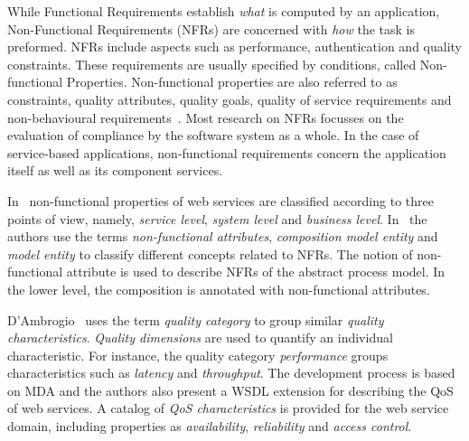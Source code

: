 While Functional Requirements establish \textit{what} is computed by an application, Non-Functional Requirements (NFRs) are concerned with \textit{how} the task is preformed.  
NFRs include aspects such as performance, authentication and quality constraints.
These requirements are usually specified by conditions, called Non-functional Properties.
Non-functional properties are also referred to as constraints, quality attributes, quality goals, quality of service requirements and non-behavioural requirements~\cite{Chung91,MylopoulosBook99,Chung2009}. 
Most research on NFRs focusses on the evaluation of compliance by the software system as a whole. %
In the case of service-based applications, non-functional requirements concern the application itself as well as its component services. 

In~\cite{Babamir2010,Yeom2006} non-functional properties of web services are classified according to three points of view, namely,  
\textit{service level}, \textit{system level} and \textit{business level}.
In~\cite{XiaoCZBOLH08} the authors use the terms  
\textit{non-functional attributes}, \textit{composition mo\-del entity} and \textit{mo\-del entity}  to classify different concepts related to NFRs.
The notion of non-functional attribute is used to describe NFRs of the abstract process model. 
In the lower level, the composition is annotated with non-functional attributes.

D'Ambrogio~\cite{DAmbrogio06} uses the term \textit{quality category} to group similar \textit{quality characteristics}. 
\textit{Quality dimensions} are used to quantify an individual characteristic.
For instance, the quality category \textit{performance} groups characteristics such as
\textit{latency} and \textit{throughput}. 
The development process is based on MDA and the authors also present a WSDL extension for describing the QoS of web services. A catalog of \textit{QoS characteristics} is provided for the web service domain, including properties as \textit{availability}, \textit{reliability} and \textit{access control}. 


